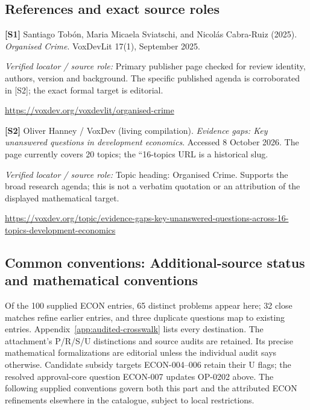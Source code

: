 \documentclass[11pt,a4paper]{article}
\begin{document}
\subsection*{References and exact source roles}

{\footnotesize\raggedright
\par\noindent\textbf{[S1]} Santiago Tobón, Maria Micaela Sviatschi, and Nicolás Cabra-Ruiz (2025). \emph{Organised Crime}. VoxDevLit 17(1), September 2025.\par \textit{Verified locator / source role:} Primary publisher page checked for review identity, authors, version and background. The specific published agenda is corroborated in [S2]; the exact formal target is editorial.\par \url{https://voxdev.org/voxdevlit/organised-crime}\par\smallskip
\par\noindent\textbf{[S2]} Oliver Hanney / VoxDev (living compilation). \emph{Evidence gaps: Key unanswered questions in development economics}. Accessed 8 October 2026. The page currently covers 20 topics; the ``16-topics URL is a historical slug.\par \textit{Verified locator / source role:} Topic heading: Organised Crime. Supports the broad research agenda; this is not a verbatim quotation or an attribution of the displayed mathematical target.\par \url{https://voxdev.org/topic/evidence-gaps-key-unanswered-questions-across-16-topics-development-economics}\par\smallskip
}

\subsection*{Common conventions: Additional-source status and mathematical conventions}

\label{audited:conventions}

Of the 100 supplied ECON entries, 65 distinct problems appear here; 32 close
matches refine earlier entries, and three duplicate questions map to existing
entries. Appendix~\ref{app:audited-crosswalk} lists every destination.
The attachment's P/R/S/U distinctions and source audits are retained. Its
precise mathematical formalizations are editorial unless the individual audit
says otherwise. Candidate subsidy targets ECON-004--006 retain their U flags;
the resolved approval-core question ECON-007 updates OP-0202 above.
The following supplied conventions govern both this part and the attributed
ECON refinements elsewhere in the catalogue, subject to local restrictions.
\end{document}
